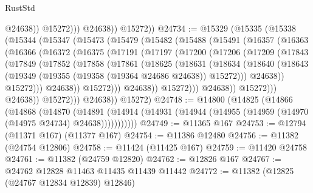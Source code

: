 \begin{lexlean}{RustStd}
\begin{coremodule}
                      @24638))
                  @15272)))
            @24638))
        @15272))
@24734 := @15329
    (@15335
      (@15338
        (@15344
          (@15347
            (@15473
              (@15479
                (@15482
                  (@15488
                    (@15491
                      (@16357
                        (@16363
                          (@16366
                            (@16372
                              (@16375
                                (@17191
                                  (@17197
                                    (@17200
                                      (@17206
                                        (@17209
                                          (@17843
                                            (@17849
                                              (@17852
                                                (@17858
                                                  (@17861
                                                    (@18625
                                                      (@18631
                                                        (@18634
                                                          (@18640
                                                            (@18643
                                                              (@19349
                                                                (@19355
                                                                  (@19358 (@19364 @24686 @24638))
                                                                  @15272)))
                                                            @24638))
                                                        @15272)))
                                                  @24638))
                                              @15272)))
                                        @24638))
                                    @15272)))
                              @24638))
                          @15272)))
                    @24638))
                @15272)))
          @24638))
      @15272)
@24748 := @14800
    (@14825
      (@14866
        (@14868
          (@14870
            (@14891
              (@14914 (@14931 (@14944 (@14955 (@14959 (@14970 (@14975 @24734) @24638)))))))))))
@24749 := @11365 @167
@24753 := @12794 (@11371 @167) (@11377 @167)
@24754 := @11386 @12480
@24756 := @11382 (@24754 @12806)
@24758 := @11424 (@11425 @167)
@24759 := @11420 @24758
@24761 := @11382 (@24759 @12820)
@24762 := @12826 @167
@24767 := @24762 @12828 @11463 @11435 @11439 @11442
@24772 := @11382 (@12825 (@24767 @12834 @12839) @12846)

\end{coremodule}
\end{lexlean}
